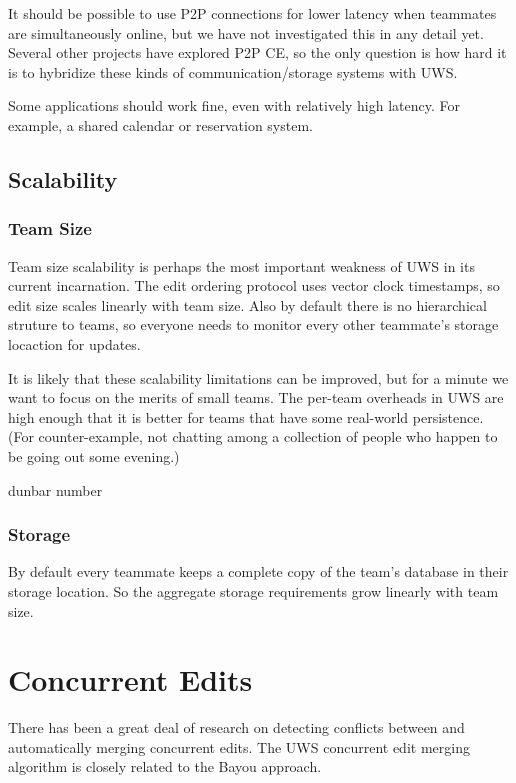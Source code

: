 \documentclass{article}
\begin{document}
It should be possible to use P2P connections for lower latency when teammates are simultaneously online, but we have not investigated this in any detail yet.
Several other projects have explored P2P CE, so the only question is how hard it is to hybridize these kinds of communication/storage systems with UWS.

Some applications should work fine, even with relatively high latency.
For example, a shared calendar or reservation system.

\subsection{Scalability}

\subsubsection{Team Size}

Team size scalability is perhaps the most important weakness of UWS in its current incarnation.
The edit ordering protocol uses vector clock timestamps, so edit size scales linearly with team size.
Also by default there is no hierarchical struture to teams, so everyone needs to monitor every other teammate's storage locaction for updates.

It is likely that these scalability limitations can be improved, but for a minute we want to focus on the merits of small teams.
The per-team overheads in UWS are high enough that it is better for teams that have some real-world persistence.
(For counter-example, not chatting among a collection of people who happen to be going out some evening.)

dunbar number

\subsubsection{Storage}

By default every teammate keeps a complete copy of the team's database in their storage location.
So the aggregate storage requirements grow linearly with team size.


\section{Concurrent Edits}

There has been a great deal of research on detecting conflicts between and automatically merging concurrent edits.
The UWS concurrent edit merging algorithm is closely related to the Bayou approach.
\end{document}
